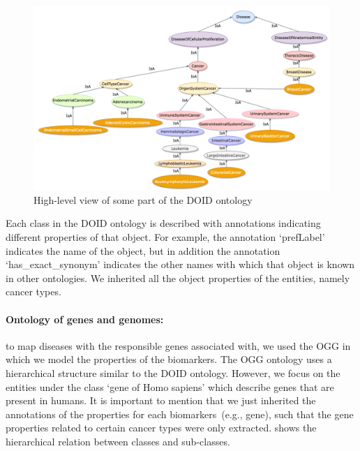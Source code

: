 \vspace{-4mm}

\begin{figure}
	\centering
	\includegraphics[scale=0.5]{images/do.png}
	\caption{High-level view of some part of the DOID ontology} 
	\label{fig:oncoontology14}
	\vspace{-2mm}
\end{figure}

\hspace*{3.5mm} Each class in the DOID ontology is described with annotations indicating different properties of that object. For example, the annotation `prefLabel' indicates the name of the object, but in addition the annotation `has\_exact\_synonym' indicates the other names with which that object is known in other ontologies. We inherited all the object properties of the entities, namely cancer types.

\paragraph{Ontology of genes and genomes:} \hspace*{-2.5mm} to map diseases with the responsible genes associated with, we used the OGG in which we model the properties of the biomarkers. The OGG ontology uses a hierarchical structure similar to the DOID ontology. However, we focus on the entities under the class `gene of Homo sapiens' which describe genes that are present in humans. It is important to mention that we just inherited the annotations of the properties for each biomarkers~(e.g., gene), such that the gene properties related to certain cancer types were only extracted.  shows the hierarchical relation between classes and sub-classes.\\

